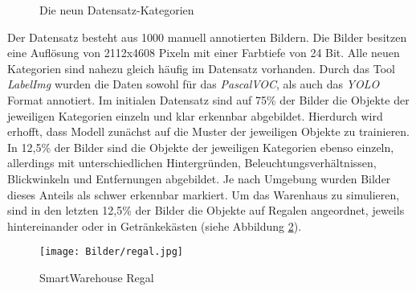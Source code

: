 \begin{figure}[htb]
	\hfill
	\hfill
	\hfill
	\hfill
	\hfill
	\hfill
	\hfill
	\hfill
	\caption{Die neun Datensatz-Kategorien}
	\label{categories}
\end{figure}

Der Datensatz besteht aus 1000 manuell annotierten Bildern. Die Bilder besitzen eine Auflösung von 2112x4608 Pixeln mit einer Farbtiefe von 24 Bit. Alle neuen Kategorien sind nahezu gleich häufig im Datensatz vorhanden. Durch das Tool \textit{LabelImg} wurden die Daten sowohl für das \textit{PascalVOC}, als auch das \textit{YOLO} Format annotiert. Im initialen Datensatz sind auf 75\% der Bilder die Objekte der jeweiligen Kategorien einzeln und klar erkennbar abgebildet. Hierdurch wird erhofft, dass Modell zunächst auf die Muster der jeweiligen Objekte zu trainieren. In 12,5\% der Bilder sind die Objekte der jeweiligen Kategorien ebenso einzeln, allerdings mit unterschiedlichen Hintergründen, Beleuchtungsverhältnissen, Blickwinkeln und Entfernungen abgebildet. Je nach Umgebung wurden Bilder dieses Anteils als schwer erkennbar markiert. Um das Warenhaus zu simulieren, sind in den letzten 12,5\% der Bilder die Objekte auf Regalen angeordnet, jeweils hintereinander oder in Getränkekästen (siehe Abbildung \ref{regal}). 

\begin{figure}[ht]
	\begin{center}
		\texttt{[image: Bilder/regal.jpg]} 
		\caption[Smart Warehouse Regal]{SmartWarehouse Regal}
		\label{regal}
	\end{center}
\end{figure}